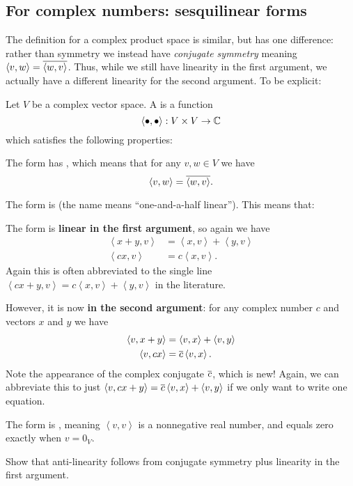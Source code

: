 \subsection{For complex numbers: sesquilinear forms}
The definition for a complex product space is similar, but has one difference:
rather than symmetry we instead have \emph{conjugate symmetry}
meaning $\left< v, w \right> = \overline{ \left< w,v \right> }$.
Thus, while we still have linearity in the first argument,
we actually have a different linearity for the second argument.
To be explicit:
\begin{definition}
	Let $V$ be a complex vector space.
	A  is a function
	\[ \left< \bullet, \bullet \right> : V \times V \to \mathbb C \]
	which satisfies the following properties:
	\begin{itemize}
		\ii The form has , which means that
		for any $v,w \in V$ we have
		\[ \left< v,w \right> = \overline{\left< w,v\right>}. \]

		\ii The form is 
		(the name means ``one-and-a-half linear'').
		This means that:
		\begin{itemize}
		\ii The form is \textbf{linear in the first argument}, so again we have
		\begin{align*}
			\left< x+y, v \right> &= \left< x,v \right> + \left< y,v \right> \\
			\left< cx, v \right> &= c\left< x,v \right>.
		\end{align*}
		Again this is often abbreviated to the single line
		$\left< cx+y, v \right> = c \left< x,v \right> + \left< y,v \right>$
		in the literature.

		\ii However, it is now \textbf{
		in the second argument}:
		for any complex number $c$ and vectors $x$ and $y$ we have
		\begin{align*}
			\left< v, x+y\right> &= \left< v, x\right> + \left< v,y \right> \\
			\left< v, cx \right> &= \overline c \left< v, x\right>.
		\end{align*}
		Note the appearance of the complex conjugate $\overline c$,
		which is new!
		Again, we can abbreviate this to just
		$\left< v, cx+y \right> = \overline c \left< v,x \right> + \left< v,y\right>$
		if we only want to write one equation.
		\end{itemize}

		\ii The form is ,
		meaning $\left<v,v\right>$ is a nonnegative real number,
		and equals zero exactly when $v = 0_V$.
	\end{itemize}
\end{definition}
\begin{exercise}
	Show that anti-linearity follows
	from conjugate symmetry plus linearity in the first argument.
\end{exercise}

